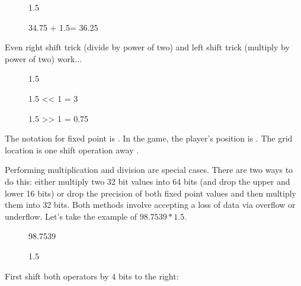 \begin{figure}[H]
 \centering
   
  \caption{1.5} 
\end{figure} 

\begin{figure}[H]
 \centering
   
  {\caption{34.75 + 1.5= 36.25}}
\end{figure} 
\par
 Even right shift trick (divide by power of two) and left shift trick (multiply by power of two) work...\\
 
 \par
\begin{figure}[H]
 \centering
   
   \caption{1.5} 
\end{figure} 

\par
\begin{figure}[H]
 \centering
   
   \caption{1.5 << 1  = 3} 
\end{figure}

\par
\begin{figure}[H]
 \centering
   
   \caption{1.5 >> 1 = 0.75} 
\end{figure}

The notation for fixed point is . In the game, the player's position is . The grid location is one shift operation away .\\
\par
Performing multiplication and division are special cases. There are two ways to do this: either multiply two 32 bit values into 64 bits (and drop the upper and lower 16 bits) or drop the precision of both fixed point values and then multiply them into 32 bits. Both methods involve accepting a loss of data via overflow or underflow. Let's take the example of $98.7539 * 1.5$.


\par
\begin{figure}[H]
 \centering
   
   \caption{98.7539} 
\end{figure} 
\par
\begin{figure}[H]
 \centering
   
   \caption{1.5} 
\end{figure} 
\par
First shift both operators by 4 bits to the right:\\
\par
\begin{figure}[H]
 \centering
   
\end{figure} 
\par
\begin{figure}[H]
 \centering
   
\end{figure} 
\par

